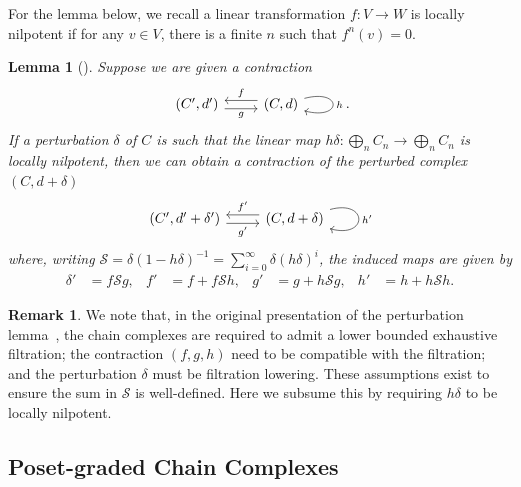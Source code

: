 \documentclass[11pt, table, nothms]{amsart}
\newtheorem{lemma}[theorem]{Lemma}
\theoremstyle{definition}
\newtheorem{remark}[theorem]{Remark}
\newcommand{\cS}{\mathcal{S}}
\begin{document}
{For the lemma below, we recall a linear transformation $f: V \to W$ is locally nilpotent if for any $v \in V$, there is a finite $n$ such that $f^n(v) = 0$.


\begin{lemma}[{\cite{Brown1965TheTheorem, Gugenheim1972OnFibration}}]\label{lemma:perturbation}
Suppose we are given a contraction
\[
\begin{tikzcd}[ampersand replacement=\&]
    (C', d') \ar[r, "g", shift right=0.3em, swap] \&
    (C, d) 
    \arrow[l, "f", shift right=0.3em, swap]
    \arrow["h", from=1-2, to=1-2, loop, in=345, out=15, distance=10mm]
\end{tikzcd}.
\]
If a perturbation $\delta$ of $C$ is such that the linear map $h \delta: \bigoplus_n C_n \to \bigoplus_n C_n$ is locally nilpotent, then we can obtain a contraction of the perturbed complex $(C, d + \delta)$
\[
\begin{tikzcd}[ampersand replacement=\&]
    (C',d' + \delta')\ar[r, "g'", shift right=0.3em, swap] \&
    {(C, d + \delta)}
    \arrow[l, "f'", shift right=0.3em, swap]
    \arrow["h'", from=1-2, to=1-2, loop, in=345, out=15, distance=10mm]
\end{tikzcd}
\]
where, writing $\cS = \delta(1- h\delta)^{-1} = \sum_{i=0}^\infty \delta (h\delta)^i$, the induced maps are given by
\begin{align}
    \delta' & = f \cS g, &  
    f' &= f + f \cS h, & 
    g' &= g + h \cS g,  & h' &= h +  h\cS h.
\end{align}
\end{lemma}
\begin{remark}
    We note that, in the original presentation of the perturbation lemma~\cite{Brown1965TheTheorem,Gugenheim1972OnFibration}, the chain complexes are required to admit a lower bounded exhaustive filtration; the contraction $(f,g,h)$ need to be compatible with the filtration; and the perturbation $\delta$ must be filtration lowering. These assumptions exist to ensure the sum in $\cS$ is well-defined. Here we subsume this by requiring $h\delta$ %
    to be locally nilpotent. 
\end{remark}



\subsection{Poset-graded Chain Complexes} \label{ssec:pgradedcc}

}
\end{document}
